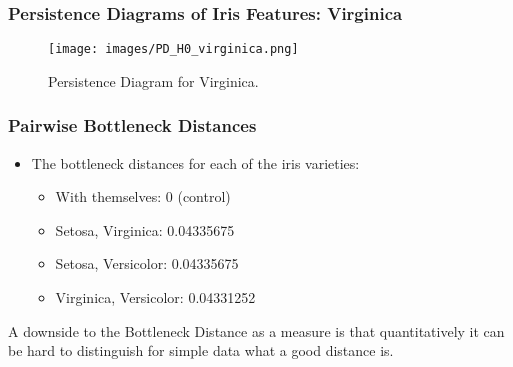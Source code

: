 		
				\begin{frame}
		\frametitle{Persistence Diagrams of Iris Features: Virginica}
		
		\begin{figure}
				\centering
				\texttt{[image: images/PD\_H0\_virginica.png]}
				\caption{Persistence Diagram for Virginica.}
		\end{figure}
		\end{frame}
		
		\begin{frame}
		\frametitle{Pairwise Bottleneck Distances}
		
		\begin{itemize}
			\item The bottleneck distances for each of the iris varieties:
				\begin{itemize}
					\item With themselves: 0 (control)
					\item Setosa, Virginica: 0.04335675
					\item Setosa, Versicolor: 0.04335675
					\item Virginica, Versicolor: 0.04331252
				\end{itemize}
		\end{itemize}
		
		A downside to the Bottleneck Distance as a measure is that quantitatively it can be hard to distinguish for simple data what a good distance is.
		\end{frame}
		